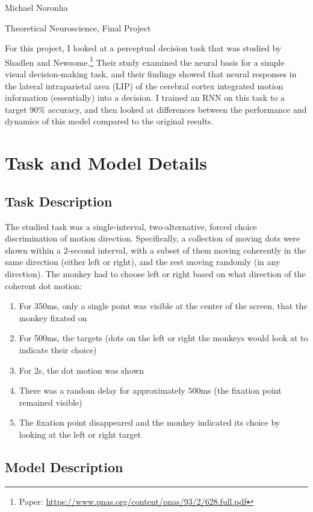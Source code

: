\documentclass[11pt]{article}
\author{Michael Noronha}
\renewcommand{\_}[1]{\underline{ #1 }}
\theoremstyle{definition}
\begin{document}
Michael Noronha
\begin{center}
{\large Theoretical Neuroscience, Final Project}
\end{center}

For this project, I looked at a perceptual decision task that was studied by Shadlen and Newsome.\footnote{Paper: \url{https://www.pnas.org/content/pnas/93/2/628.full.pdf}} Their study examined the neural basis for a simple visual decision-making task, and their findings showed that neural responses in the lateral intraparietal area (LIP) of the cerebral cortex integrated motion information (essentially) into a decision. I trained an RNN on this task to a target $90\%$ accuracy, and then looked at differences between the performance and dynamics of this model compared to the original results.

\section{Task and Model Details}
\subsection{Task Description}
\label{task_breakdown}

The studied task was a single-interval, two-alternative, forced choice discrimination of motion direction. Specifically, a collection of moving dots were shown within a $2$-second interval, with a subset of them moving coherently in the same direction (either left or right), and the rest moving randomly (in any direction). The monkey had to choose left or right based on what direction of the coherent dot motion:
\begin{enumerate}
  \item For 350ms, only a single point was visible at the center of the screen, that the monkey fixated on
  \item For 500ms, the targets (dots on the left or right the monkeys would look at to indicate their choice)
  \item For 2s, the dot motion was shown
  \item There was a random delay for approximately $500$ms (the fixation point remained visible)
  \item The fixation point disappeared and the monkey indicated its choice by looking at the left or right target
\end{enumerate}

\subsection{Model Description}
\end{document}
